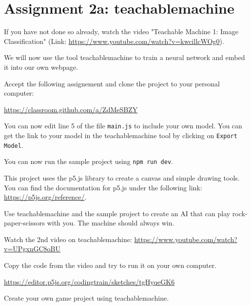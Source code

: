\documentclass[12pt,a4paper]{report}
\begin{document}
\section*{Assignment 2a: teachablemachine}

\begin{ex}
    If you have not done so already, watch the video "Teachable Machine 1: Image Classification" (Link: \url{https://www.youtube.com/watch?v=kwcillcWOg0}).
\end{ex}

We will now use the tool teachablemachine to train a neural network and embed it into our own webpage.

\begin{ex}
    Accept the following assignement and clone the project to your personal computer:
    
    \url{https://classroom.github.com/a/ZdMeSBZY}

    You can now edit line 5 of the file \verb|main.js| to include your own model. You can get the link to your model in the teachablemachine tool by clicking on \verb|Export Model|.

   You can now run the sample project using \verb|npm run dev|.

   This project uses the p5.js library to create a canvas and simple drawing tools. You can find the documentation for p5.js under the following link: \url{https://p5js.org/reference/}.
\end{ex}

\begin{ex}
    Use teachablemachine and the sample project to create an AI that can play rock-paper-scissors with you. The machine should always win.
\end{ex}

\begin{ex}
     Watch the 2nd video on teachablemachine: \url{https://www.youtube.com/watch?v=UPgxnGC8oBU}
\end{ex}

\begin{ex}
     Copy the code from the video and try to run it on your own computer.

     \url{https://editor.p5js.org/codingtrain/sketches/tgHyqeGK6}
\end{ex}


\begin{ex}
     Create your own game project using teachablemachine.
\end{ex}
\end{document}

